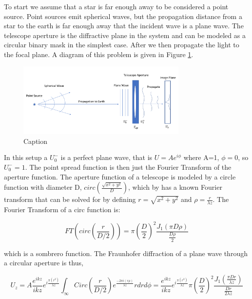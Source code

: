 To start we assume that a star is far enough away to be considered a point source. Point sources emit spherical waves, but the propagation distance from a star to the earth is far enough away that the incident wave is a plane wave. The telescope aperture is the diffractive plane in the system and can be modeled as a circular binary mask in the simplest case. After we then propagate the light to the focal plane. A diagram of this problem is given in Figure \ref{fig:propagation}. 

\begin{figure}
    \centering
    \includegraphics[width=0.75\textwidth]{Chapter Materials/Introduction Materials/Introduction Figures/Propagation.png}
    \caption{Caption}
    \label{fig:propagation}
\end{figure}

In this setup a $U_0^-$ is a perfect plane wave, that is $U=Ae^{i\phi}$ where A=1, $\phi =0$, so $U_0^-=1$. The point spread function is then just the Fourier Transform of the aperture function. The aperture function of a telescope is modeled by a circle function with diameter D, $circ(\frac{\sqrt{x^2+y^2}}{D})$, which by has a known Fourier transform that can be solved for by defining $r=\sqrt{x^2+y^2}$ and $\rho=\frac{r}{\lambda z}$. The Fourier Transform of a circ function is:

\begin{equation}
    FT(circ(\frac{r}{D/2}))=\pi{(\frac{D}{2})}^2 \frac{J_1(\pi D \rho)}{\frac{D\rho}{2}}
\end{equation}

which is a sombrero function. The Fraunhofer diffraction of a plane wave through a circular aperture is thus, 

\begin{equation}
   U_z=A\frac{e^{ikz}}{ikz}e^{i\frac{\pi (r^2)}{\lambda z}}\int_{\infty} Circ(\frac{r}{D/2})e^{\frac{-2\pi i (r \rho )}{\lambda z}}rdrd\phi= \frac{e^{ikz}}{ikz}e^{i\frac{\pi (r^2)}{\lambda z}} {\pi(\frac{D}{2})}^2 \frac{J_1 (\frac{\pi Dr}{\lambda z})}{\frac{Dr}{2\lambda z}}
\end{equation}

